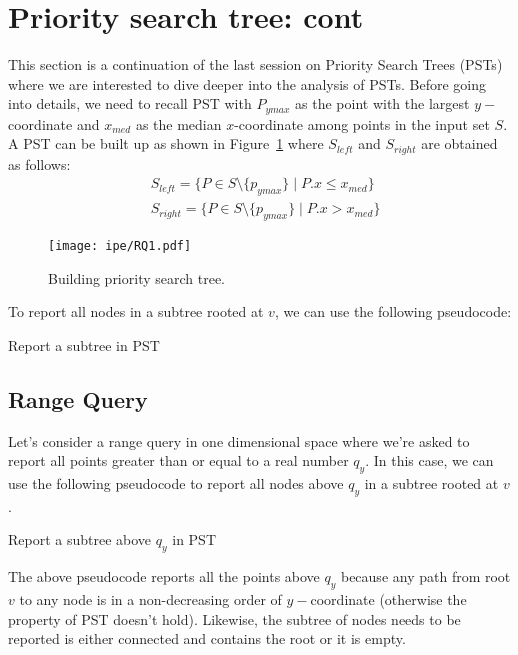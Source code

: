 \section{Priority search tree: cont}
\label{sec:range-queries}

This section is a continuation of the last session on Priority Search Trees (PSTs) where we are interested to dive deeper into the analysis of PSTs. Before going into details, we need to recall PST with $P_{ymax}$ as the point with the largest $y-$coordinate and $x_{med}$ as the median $x$-coordinate among points in the input set $S$. A PST can be built up as shown in Figure~\ref{fig:PST1} where $S_{left}$ and $S_{right}$ are obtained as follows:
\begin{align*}
    & S_{left}=\{P \in S\setminus \{p_{ymax}\} \mid P.x \leq x_{med} \}\\
    &  S_{right}=\{P \in S\setminus \{p_{ymax}\} \mid P.x > x_{med} \}
\end{align*}
\begin{figure}[h!]
\begin{center}
  \texttt{[image: ipe/RQ1.pdf]}
  \vspace{-0.1in}
  \caption{Building priority search tree.}
  \label{fig:PST1}
\end{center}
\end{figure}

To report all nodes in a subtree rooted at $v$, we can use the following pseudocode:
\begin{algorithm}[H]
\caption{Report a subtree in PST}\label{Report_subtree1}
\begin{algorithmic}[1]
    \State {}
    \State {}
    \State {}
\EndIf
\EndFunction
\end{algorithmic}
\end{algorithm}

\subsection{Range Query}
Let's consider a range query in one dimensional space where we're asked to report all points greater than or equal to a real number $q_y$. In this case, we can use the following pseudocode to report all nodes above $q_y$ in a subtree rooted at $v$.
\begin{algorithm}[H]
\caption{Report a subtree above $q_y$ in PST}\label{Report_subtree2}
\begin{algorithmic}[1]
        \State {}
        \State {}
        \State {}
    \EndIf
\EndIf
\EndFunction
\end{algorithmic}
\end{algorithm}
The above pseudocode reports all the points above $q_y$ because any path from root $v$ to any node is in a non-decreasing order of $y-$coordinate (otherwise the property of PST doesn't hold). Likewise, the subtree of nodes needs to be reported is either connected and contains the root or it is empty.


